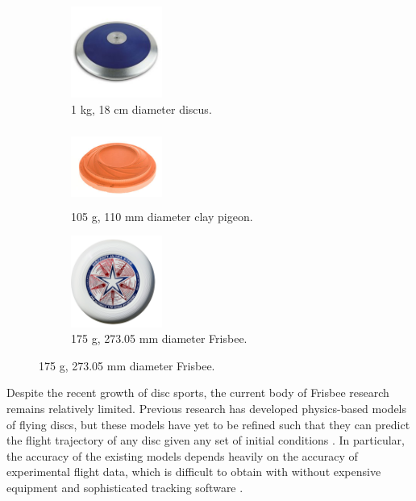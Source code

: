 \documentclass[a4paper,12pt, oneside]{article}
\begin{document}
\begin{figure}[h]
\centering
	\begin{subfigure}[b]{0.25\textwidth}
		\includegraphics[width=3cm, height=3cm]{discus}
		\caption{1 kg, 18 cm \newline diameter discus. }
    		\label{fig:1}
	\end{subfigure}
	\begin{subfigure}[b]{0.25\textwidth}
		\includegraphics[width=3cm, height=2.5cm]{claypig}
		\caption{105 g, 110 mm \newline diameter clay pigeon.}
   		 \label{fig:2}
	\end{subfigure}
	\begin{subfigure}[b]{0.25\textwidth}
		\includegraphics[width=3cm, height=3cm]{discraftultra}
		\caption{175 g, 273.05 mm diameter Frisbee.}
    		\label{fig:3}
	\end{subfigure}
\end{figure}

Despite the recent growth of disc sports, the current body of Frisbee research remains relatively limited. Previous research has developed physics-based models of flying discs, but these models have yet to be refined such that they can predict the flight trajectory of any disc given any set of initial conditions \cite{H3, pottsandcrowther2007, yasuda, mitchell, stilleyandcarstens, morrison}. In particular, the accuracy of the existing models depends heavily on the accuracy of experimental flight data, which is difficult to obtain with without expensive equipment and sophisticated tracking software \cite{H3}.
\end{document}
